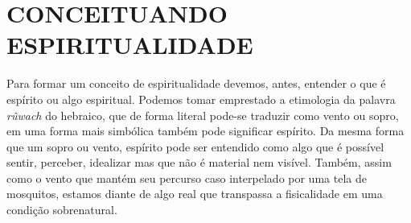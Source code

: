 \documentclass[
    article,            %
	12pt,				%
	oneside,			%
	a4paper,			%
	chapter=TITLE,		%
	section=TITLE,		%
	english,			%
	french,				%
	spanish,			%
	brazil				%
	]{abntex2}
\begin{document}



\imprimircapa

\imprimirfolhaderosto


\textual
\pagestyle{simple}




 
 

\section*{CONCEITUANDO ESPIRITUALIDADE}

Para formar um conceito de espiritualidade devemos, antes, entender o que é espírito ou algo espiritual. Podemos tomar emprestado a etimologia da palavra \emph{rûwach} do hebraico, que de forma literal pode-se traduzir como vento ou sopro, em uma forma mais simbólica também pode significar espírito. Da mesma forma que um sopro ou vento, espírito pode ser entendido como algo que é possível sentir, perceber, idealizar mas que não é material nem visível. Também, assim como o vento que mantém seu percurso caso interpelado por uma tela de mosquitos, estamos diante de algo real que transpassa a fisicalidade em uma condição sobrenatural.
\end{document}
